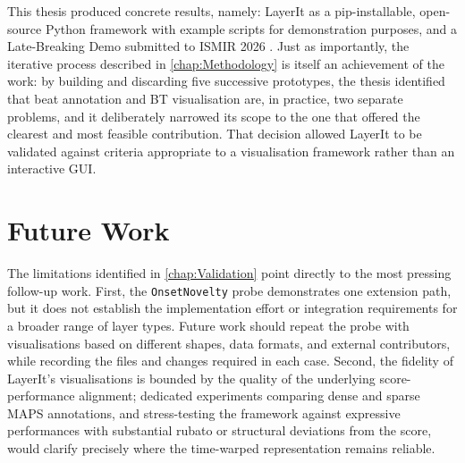 This thesis produced concrete results, namely: LayerIt as a pip-installable, open-source Python framework with example scripts for demonstration purposes, and a Late-Breaking Demo submitted to ISMIR 2026 \cite{azeredoLayerItTowardsFramework2026}. Just as importantly, the iterative process described in \autoref{chap:Methodology} is itself an achievement of the work: by building and discarding five successive prototypes, the thesis identified that beat annotation and BT visualisation are, in practice, two separate problems, and it deliberately narrowed its scope to the one that offered the clearest and most feasible contribution. That decision allowed LayerIt to be validated against criteria appropriate to a visualisation framework rather than an interactive GUI.


\section{Future Work}

The limitations identified in \autoref{chap:Validation} point directly to the most pressing follow-up work. First, the \texttt{OnsetNovelty} probe demonstrates one extension path, but it does not establish the implementation effort or integration requirements for a broader range of layer types. Future work should repeat the probe with visualisations based on different shapes, data formats, and external contributors, while recording the files and changes required in each case. Second, the fidelity of LayerIt's visualisations is bounded by the quality of the underlying score-performance alignment; dedicated experiments comparing dense and sparse MAPS annotations, and stress-testing the framework against expressive performances with substantial rubato or structural deviations from the score, would clarify precisely where the time-warped representation remains reliable.

